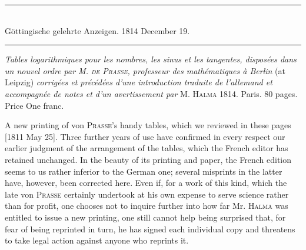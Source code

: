 \par{}
\begin{center}
\rule{0.63\linewidth}{0.3pt}\\
Göttingische gelehrte Anzeigen. 1814 December 19.\\
\rule{0.63\linewidth}{0.3pt}
\end{center}

\emph{Tables logarithmiques pour les nombres, les sinus et les tangentes, disposées
dans un nouvel ordre par M. \textup{\textsc{de Prasse}}, professeur des mathématiques à Berlin} (at
Leipzig) \emph{corrigées et précédées d’une introduction traduite de l’allemand et accompagnée de notes et d’un avertissement par} M. \textsc{Halma} 1814. Paris. 80 pages. Price
One franc.

A new printing of von \textsc{Prasse}'s handy tables, which we reviewed in these pages [1811 May 25]. Three further years of use have confirmed in every respect our earlier judgment of the arrangement of the tables, which the French editor has retained unchanged. In the beauty of its printing and paper, the French edition seems to us rather inferior to the German one; several misprints in the latter have, however, been corrected here. Even if, for a work of this kind, which the late von \textsc{Prasse} certainly undertook at his own expense to serve science rather than for profit, one chooses not to inquire further into how far Mr. \textsc{Halma} was entitled to issue a new printing, one still cannot help being surprised that, for fear of being reprinted in turn, he has signed each individual copy and threatens to take legal action against anyone who reprints it.
